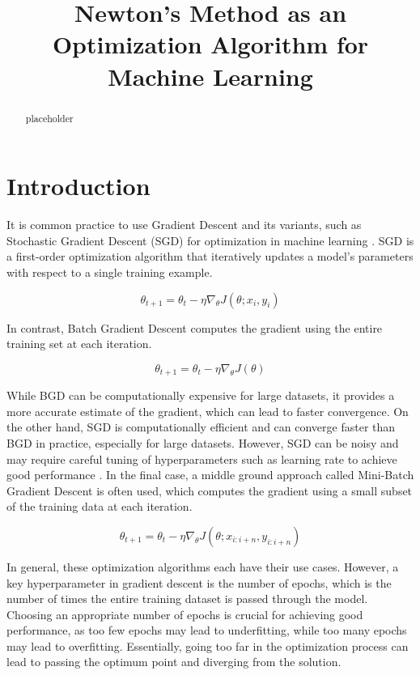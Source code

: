 \documentclass[conference]{IEEEtran}
\title{Newton's Method as an Optimization Algorithm for Machine Learning}
\author{
    \IEEEauthorblockN{Tyler Forgione}
}
\date{}
\begin{document}
\maketitle

\begin{abstract}
    placeholder
\end{abstract}

\section{Introduction}

It is common practice to use Gradient Descent and its variants, such as Stochastic Gradient Descent (SGD) for optimization in machine learning \cite{bottou_1991}. SGD is a first-order optimization algorithm that iteratively updates a model's parameters with respect to a single training example.

\begin{equation}
    \theta_{t+1} = \theta_t - \eta \nabla_\theta J(\theta; x_i, y_i)
    \label{eq:sgd}
\end{equation}

In contrast, Batch Gradient Descent computes the gradient using the entire training set at each iteration.

\begin{equation}
    \theta_{t+1} = \theta_t - \eta \nabla_\theta J(\theta)
    \label{eq:bgd}
\end{equation}

While BGD can be computationally expensive for large datasets, it provides a more accurate estimate of the gradient, which can lead to faster convergence. On the other hand, SGD is computationally efficient and can converge faster than BGD in practice, especially for large datasets. However, SGD can be noisy and may require careful tuning of hyperparameters such as learning rate to achieve good performance \cite{DBLP:journals/corr/Ruder16}. In the final case, a middle ground approach called Mini-Batch Gradient Descent is often used, which computes the gradient using a small subset of the training data at each iteration.

\begin{equation}
    \theta_{t+1} = \theta_t - \eta \nabla_\theta J(\theta; x_{i:i+n}, y_{i:i+n})
    \label{eq:mbgd}
\end{equation}

In general, these optimization algorithms each have their use cases. However, a key hyperparameter in gradient descent is the number of epochs, which is the number of times the entire training dataset is passed through the model. Choosing an appropriate number of epochs is crucial for achieving good performance, as too few epochs may lead to underfitting, while too many epochs may lead to overfitting. Essentially, going too far in the optimization process can lead to passing the optimum point and diverging from the solution.
\end{document}
